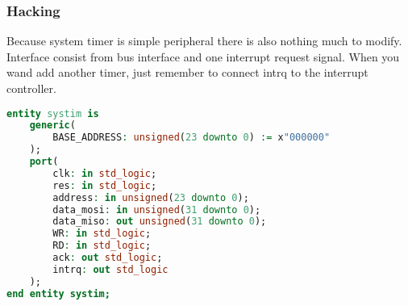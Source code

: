 \subsubsection{Hacking}

Because system timer is simple peripheral there is also nothing much to modify. Interface
consist from bus interface and one interrupt request signal. When you wand add another
timer, just remember to connect intrq to the interrupt controller.

\begin{lstlisting}[language=VHDL, frame=single]
entity systim is
    generic(
        BASE_ADDRESS: unsigned(23 downto 0) := x"000000"
    );
    port(
        clk: in std_logic;
        res: in std_logic;
        address: in unsigned(23 downto 0);
        data_mosi: in unsigned(31 downto 0);
        data_miso: out unsigned(31 downto 0);
        WR: in std_logic;
        RD: in std_logic;
        ack: out std_logic;
        intrq: out std_logic
    );
end entity systim;
\end{lstlisting}
